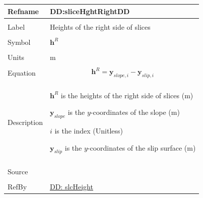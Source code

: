 \documentclass[12pt]{article}
\begin{document}
\vspace{\baselineskip}
\noindent
\begin{minipage}{\textwidth}
\begin{tabular}{>{\raggedright}p{}>{\raggedright\arraybackslash}p{}}
\toprule \textbf{Refname} & \textbf{DD:sliceHghtRightDD}
\label{DD:sliceHghtRightDD}
\\ \midrule \\
Label & Heights of the right side of slices
        
\\ \midrule \\
Symbol & ${\mathbf{h}^{R}}$
         
\\ \midrule \\
Units & m
        
\\ \midrule \\
Equation & \begin{displaymath}
           {\mathbf{h}^{R}}={\mathbf{y}_{slope,i}}-{\mathbf{y}_{slip,i}}
           \end{displaymath}
\\ \midrule \\
Description & \begin{symbDescription}
              \item{${\mathbf{h}^{R}}$ is the heights of the right side of slices (m)}
              \item{${\mathbf{y}_{slope}}$ is the $y$-coordinates of the slope (m)}
              \item{$i$ is the index (Unitless)}
              \item{${\mathbf{y}_{slip}}$ is the $y$-coordinates of the slip surface (m)}
              \end{symbDescription}
\\ \midrule \\
Source & \cite{fredlund1977}
         
\\ \midrule \\
RefBy & \hyperref[DD:slcHeight]{DD: slcHeight}
        
\\ \bottomrule
\end{tabular}
\end{minipage}
\end{document}
